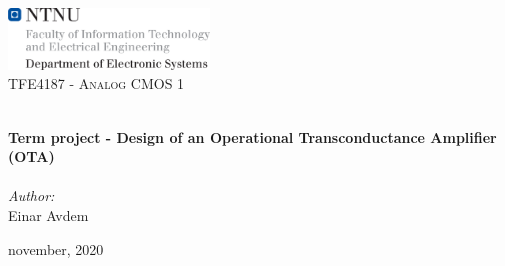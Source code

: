 \begin{titlepage}
\vbox{ }
\vbox{ }
\begin{center}
\includegraphics[width=0.40\textwidth]{Images/NTNU_ies.png}\\[1cm]
\textsc{\Large TFE4187 - Analog CMOS 1}\\[0.5cm]
\vbox{ }

\HRule \\[0.4cm]
{ \huge \bfseries Term project - Design of an Operational Transconductance Amplifier (OTA)}\\[0.4cm]
\HRule \\[1.5cm]

\large
\normalem
\emph{Author:}\\
Einar Avdem
\vfill

{\large november, 2020}
\end{center}
\end{titlepage}